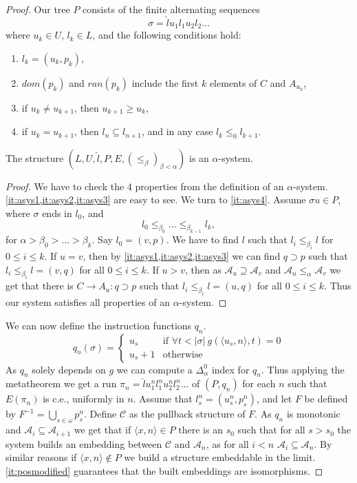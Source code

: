 \documentclass{amsart}
\newcommand\+[1]{\mathcal{#1}}
\renewcommand\*[1]{\mathbf{#1}}
\renewcommand\=[1]{\text{#1}}
\renewcommand\*[1]{\mathbf{#1}}
\newcommand{\A}{\mathcal{A}}
\newcommand{\mc}[1]{\mathcal{#1}}
\newcommand{\ra}{\rightarrow}
\begin{document}
\begin{proof}
Our tree $P$ consists of the finite alternating sequences
\[ \sigma=\hat lu_1l_1u_2l_2\dots\]
where $u_k\in U$, $l_k\in L$, and the following conditions hold:
\begin{enumerate}[label=(\alph*)]
    \item $l_k=(u_k,p_k)$,
    \item\label{it:posmodified} $dom(p_k)$ and $ran(p_k)$ include the first $k$ elements of $C$ and $A_{u_k}$,
    \item if $u_k\neq u_{k+1}$, then $u_{k+1}\geq u_k$,
    \item if $u_k=u_{k+1}$, then $l_n\subseteq l_{n+1}$, and in any case $l_k\leq_0 l_{k+1}$.
\end{enumerate}
\begin{claim}
 The structure $(L,U,\hat l, P,E,(\leq_\beta)_{\beta<\alpha})$ is an $\alpha$-system.
\end{claim}
\begin{proof}
We have to check the $4$ properties from the definition of an $\alpha$-system. \cref{it:asys1,it:asys2,it:asys3} are easy to see. We turn to \cref{it:asys4}. Assume $\sigma u\in P$, where $\sigma$ ends in $l_0$, and
\[ l_0\leq_{\beta_0}\dots \leq_{\beta_{k-1}} l_k,\]
for $\alpha>\beta_0>\dots>\beta_k$. Say $l_0=(v,p)$. We have to find $l$ such that $l_i\leq_{\beta_i} l$ for $0\leq i\leq k$. If $u=v$, then by \cref{it:asys1,it:asys2,it:asys3} we can find $q\supset p$ such that $l_i \leq_{\beta_i} l=(v,q)$ for all $0\leq i\leq k$. If $u>v$, then as $\A_{u} \supseteq \A_v$ and $\A_{u}\leq_{\alpha}\A_{v}$ we get that there is $C\ra A_u:q \supset p$ such that $l_i\leq_{\beta_i}l=(u,q)$ for all $0\leq i\leq k$. Thus our system satisfies all properties of an $\alpha$-system.
\end{proof}
We can now define the instruction functions $q_n$.
\[ q_n(\sigma)=\begin{cases}
u_s & \text{if } \forall t< |\sigma|\ g(\langle u_s,n\rangle,t)=0\\
u_s+1 &\text{otherwise}
\end{cases}\]
As $q_n$ solely depends on $g$ we can compute a $\Delta_\alpha^0$ index for $q_n$. Thus applying the metatheorem we get a run $\pi_n=\hat l u_1^n l_1^n u_2^n l_2^n\dots$ of $(P,q_n)$ for each $n$ such that $E(\pi_n)$ is c.e., uniformly in $n$.
Assume that $l_s^n=(u_s^n,p_s^n)$, and let $F$ be defined by $F^{-1}=\bigcup_{s\in \omega} p_s^{n}$. Define $\mc C$ as the pullback structure of $F$. As $q_n$ is monotonic and $\A_i\subseteq \A_{i+1}$ we get that if $\langle x,n\rangle\in P$ there is an $s_0$ such that for all $s>s_0$ the system builds an embedding between $\mc C$ and $\mc A_n$, as for all $i<n$ $\A_i\subseteq \A_n$. By similar reasons if $\langle x,n\rangle\not \in P$ we build a structure embeddable in the limit. \cref{it:posmodified} guarantees that the built embeddings are isomorphisms.
\end{proof}
\end{document}

